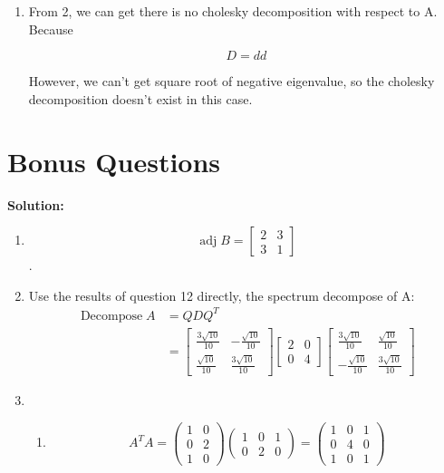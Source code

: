 \documentclass[11pt]{article} %
\begin{document}
\begin{enumerate}
\item 
From 2, we can get there is no cholesky decomposition with respect to A.
Because 

$$D=dd$$

However, we can't get square root of negative eigenvalue, so the cholesky decomposition doesn't exist in this case. 

\end{enumerate}

\section{Bonus Questions}
\textbf{Solution:}

\begin{enumerate}
	\item 
	$$\operatorname{adj}{B}=\begin{bmatrix}
		2&3\\3&1
	\end{bmatrix}$$.
\item 
Use the results of question 12 directly, the spectrum decompose of A:
\begin{align*}
	\operatorname{Decompose}{A}&=QDQ^T\\
	&=\begin{bmatrix}
		\frac{3\sqrt{10}}{10}&-\frac{\sqrt{10}}{10}\\
		\frac{\sqrt{10}}{10}&\frac{3\sqrt{10}}{10}
	\end{bmatrix}\begin{bmatrix}
	2&0\\0&4
\end{bmatrix}\begin{bmatrix}
\frac{3\sqrt{10}}{10}&\frac{\sqrt{10}}{10}\\
-\frac{\sqrt{10}}{10}&\frac{3\sqrt{10}}{10}
\end{bmatrix}
\end{align*}

\item 
\begin{enumerate}
	\item $$A^TA=\begin{pmatrix}
		1&0\\0&2\\1&0
	\end{pmatrix}\begin{pmatrix}
	1&0&1\\0&2&0
\end{pmatrix}=\begin{pmatrix}
1&0&1\\0&4&0\\1&0&1
\end{pmatrix}$$


\end{enumerate}
\end{enumerate}
\end{document}

